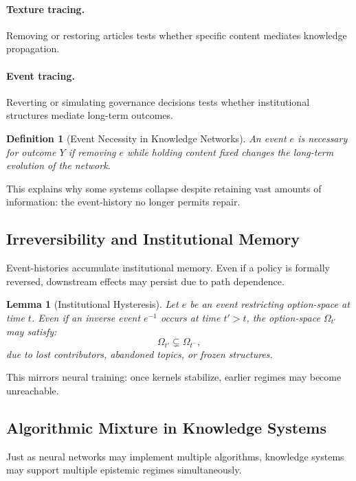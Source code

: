\documentclass[11pt]{article}
\newtheorem{definition}{Definition}
\newtheorem{lemma}{Lemma}
\theoremstyle{remark}
\begin{document}
\paragraph{Texture tracing.}
Removing or restoring articles tests whether specific content mediates
knowledge propagation.

\paragraph{Event tracing.}
Reverting or simulating governance decisions tests whether institutional
structures mediate long-term outcomes.

\begin{definition}[Event Necessity in Knowledge Networks]
An event $e$ is necessary for outcome $Y$ if removing $e$ while holding
content fixed changes the long-term evolution of the network.
\end{definition}

This explains why some systems collapse despite retaining vast amounts
of information: the event-history no longer permits repair.

\subsection{Irreversibility and Institutional Memory}

Event-histories accumulate institutional memory. Even if a policy is
formally reversed, downstream effects may persist due to path
dependence.

\begin{lemma}[Institutional Hysteresis]
Let $e$ be an event restricting option-space at time $t$. Even if an
inverse event $e^{-1}$ occurs at time $t' > t$, the option-space
$\Omega_{t'}$ may satisfy:
\[
\Omega_{t'} \subsetneq \Omega_{t^-},
\]
due to lost contributors, abandoned topics, or frozen structures.
\end{lemma}

This mirrors neural training: once kernels stabilize, earlier regimes
may become unreachable.

\subsection{Algorithmic Mixture in Knowledge Systems}

Just as neural networks may implement multiple algorithms, knowledge
systems may support multiple epistemic regimes simultaneously.
\end{document}
